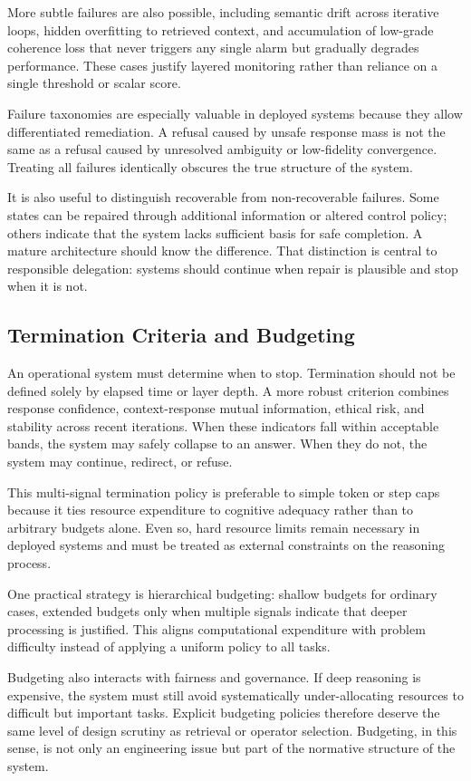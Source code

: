 \documentclass[12pt]{article}
\begin{document}
More subtle failures are also possible, including semantic drift across iterative loops, hidden overfitting to retrieved context, and accumulation of low-grade coherence loss that never triggers any single alarm but gradually degrades performance. These cases justify layered monitoring rather than reliance on a single threshold or scalar score.

Failure taxonomies are especially valuable in deployed systems because they allow differentiated remediation. A refusal caused by unsafe response mass is not the same as a refusal caused by unresolved ambiguity or low-fidelity convergence. Treating all failures identically obscures the true structure of the system.

It is also useful to distinguish recoverable from non-recoverable failures. Some states can be repaired through additional information or altered control policy; others indicate that the system lacks sufficient basis for safe completion. A mature architecture should know the difference. That distinction is central to responsible delegation: systems should continue when repair is plausible and stop when it is not.

\subsection{Termination Criteria and Budgeting}
An operational system must determine when to stop. Termination should not be defined solely by elapsed time or layer depth. A more robust criterion combines response confidence, context-response mutual information, ethical risk, and stability across recent iterations. When these indicators fall within acceptable bands, the system may safely collapse to an answer. When they do not, the system may continue, redirect, or refuse.

This multi-signal termination policy is preferable to simple token or step caps because it ties resource expenditure to cognitive adequacy rather than to arbitrary budgets alone. Even so, hard resource limits remain necessary in deployed systems and must be treated as external constraints on the reasoning process.

One practical strategy is hierarchical budgeting: shallow budgets for ordinary cases, extended budgets only when multiple signals indicate that deeper processing is justified. This aligns computational expenditure with problem difficulty instead of applying a uniform policy to all tasks.

Budgeting also interacts with fairness and governance. If deep reasoning is expensive, the system must still avoid systematically under-allocating resources to difficult but important tasks. Explicit budgeting policies therefore deserve the same level of design scrutiny as retrieval or operator selection. Budgeting, in this sense, is not only an engineering issue but part of the normative structure of the system.
\end{document}

